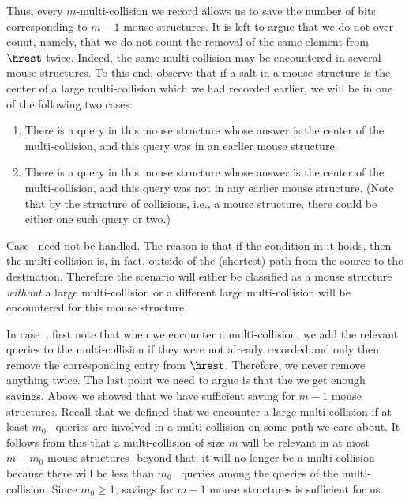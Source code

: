 Thus, every $m$-multi-collision we record allows us to save the number of bits corresponding to $m-1$ mouse structures. It is left to argue that we do not over-count, namely, that we do not count the removal of the same element from $\hrest$ twice. Indeed, the same multi-collision may be encountered in several mouse structures. To this end, observe that if a salt in a mouse structure is the center of a large multi-collision which we had recorded earlier, we will be in one of the following two cases:
\begin{enumerate}
  \item \label{firstcase}There is a query in this mouse structure whose answer is the center of the multi-collision, and this query was in an earlier mouse structure.
  \item \label{secondcase}There is a query in this mouse structure whose answer is the center of the multi-collision, and this query was not in any earlier mouse structure. (Note that by the structure of collisions, i.e., a mouse structure, there could be either one such query or two.)
\end{enumerate}
Case~ need not be handled. The reason is that if the condition in it holds, then the multi-collision is, in fact, outside of the (shortest) path from the source to the destination. Therefore the scenario will either be classified as a mouse structure \emph{without} a large multi-collision or a different large multi-collision will be encountered for this mouse structure.

In case~, first note that when we encounter a multi-collision, we add the relevant queries to the multi-collision if they were not already recorded and only then remove the corresponding entry from $\hrest$. Therefore, we never remove anything twice. The last point we need to argue is that the we get enough savings.
Above we showed that we have sufficient saving for $m-1$ mouse structures. Recall that we defined that we encounter a large multi-collision if at least $m_0$ \urep\ queries are involved in a multi-collision on some path we care about. It follows from this that a multi-collision of size $m$ will be relevant in at most $m-m_0$ mouse structures- beyond that, it will no longer be a multi-collision because there will be less than $m_0$ \urep\ queries among the queries of the multi-collision. Since $m_0\geq 1$, savings for $m-1$ mouse structures is sufficient for us.

